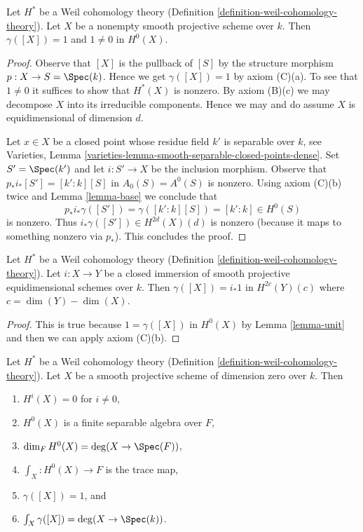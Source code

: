 \begin{lemma}
\label{lemma-unit}
Let $H^*$ be a Weil cohomology theory
(Definition \ref{definition-weil-cohomology-theory}).
Let $X$ be a nonempty smooth projective scheme over $k$.
Then $\gamma([X]) = 1$ and $1 \not = 0$ in $H^0(X)$.
\end{lemma}

\begin{proof}
Observe that $[X]$ is the pullback of $[S]$ by the structure morphism
$p : X \to S = \Spec(k)$. Hence we get $\gamma([X]) = 1$ by axiom (C)(a).
To see that $1 \not = 0$ it suffices to show that $H^*(X)$ is nonzero.
By axiom (B)(c) we may decompose $X$ into its irreducible components.
Hence we may and do assume $X$ is equidimensional of dimension $d$.

\medskip\noindent
Let $x \in X$ be a closed point whose residue field $k'$ is separable over $k$,
see Varieties, Lemma \ref{varieties-lemma-smooth-separable-closed-points-dense}.
Set $S' = \Spec(k')$ and let
$i : S' \to X$ be the inclusion morphism. Observe that
$p_*i_*[S'] = [k' : k][S]$ in $A_0(S) = A^0(S)$ is nonzero.
Using axiom (C)(b) twice and Lemma \ref{lemma-base}
we conclude that
$$
p_*i_*\gamma([S']) = \gamma([k' : k][S]) = [k' : k] \in H^0(S)
$$
is nonzero. Thus $i_*\gamma([S']) \in H^{2d}(X)(d)$ is nonzero
(because it maps to something nonzero via $p_*$). This concludes the proof.
\end{proof}

\begin{lemma}
\label{lemma-push-unit}
Let $H^*$ be a Weil cohomology theory
(Definition \ref{definition-weil-cohomology-theory}). Let $i : X \to Y$
be a closed immersion of smooth projective equidimensional schemes over $k$.
Then $\gamma([X]) = i_*1$ in $H^{2c}(Y)(c)$ where $c = \dim(Y) - \dim(X)$.
\end{lemma}

\begin{proof}
This is true because $1 = \gamma([X])$ in $H^0(X)$ by Lemma \ref{lemma-unit}
and then we can apply axiom (C)(b).
\end{proof}

\begin{lemma}
\label{lemma-dim-0}
Let $H^*$ be a Weil cohomology theory
(Definition \ref{definition-weil-cohomology-theory}).
Let $X$ be a smooth projective scheme of dimension zero over $k$.
Then
\begin{enumerate}
\item $H^i(X) = 0$ for $i \not = 0$,
\item $H^0(X)$ is a finite separable algebra over $F$,
\item $\dim_F H^0(X) = \deg(X \to \Spec(F))$,
\item $\int_X : H^0(X) \to F$ is the trace map,
\item $\gamma([X]) = 1$, and
\item $\int_X \gamma([X]) = \deg(X \to \Spec(k))$.
\end{enumerate}
\end{lemma}

